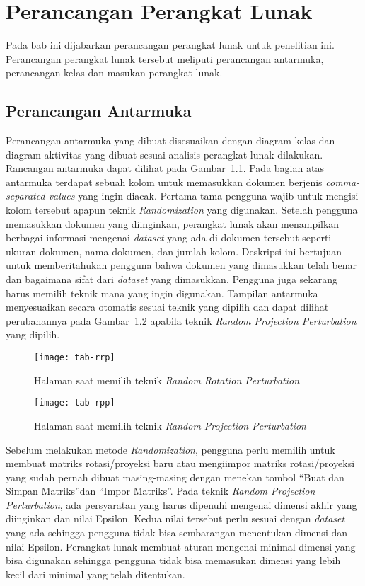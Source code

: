 \chapter{Perancangan Perangkat Lunak}
\label{chap:perancangan}

Pada bab ini dijabarkan perancangan perangkat lunak untuk penelitian ini. Perancangan perangkat lunak tersebut meliputi perancangan antarmuka, perancangan kelas dan masukan perangkat lunak.

\section{Perancangan Antarmuka}
\label{sec:antarmuka}

Perancangan antarmuka yang dibuat disesuaikan dengan diagram kelas dan diagram aktivitas yang dibuat sesuai analisis perangkat lunak dilakukan. Rancangan antarmuka dapat dilihat pada Gambar~\ref{fig:tab-rrp}. Pada bagian atas antarmuka terdapat sebuah kolom untuk memasukkan dokumen berjenis \textit{comma-separated values} yang ingin diacak. Pertama-tama pengguna wajib untuk mengisi kolom tersebut apapun teknik \textit{Randomization} yang digunakan. Setelah pengguna memasukkan dokumen yang diinginkan, perangkat lunak akan menampilkan berbagai informasi mengenai \textit{dataset} yang ada di dokumen tersebut seperti ukuran dokumen, nama dokumen, dan jumlah kolom. Deskripsi ini bertujuan untuk memberitahukan pengguna bahwa dokumen yang dimasukkan telah benar dan bagaimana sifat dari \textit{dataset} yang dimasukkan. Pengguna juga sekarang harus memilih teknik mana yang ingin digunakan. Tampilan antarmuka menyesuaikan secara otomatis sesuai teknik yang dipilih dan dapat dilihat perubahannya pada Gambar~\ref{fig:tab-rpp} apabila teknik \textit{Random Projection Perturbation} yang dipilih. 

\begin{figure}
	\centering
	\texttt{[image: tab-rrp]}
	\caption{Halaman saat memilih teknik \textit{Random Rotation Perturbation}}
	\label{fig:tab-rrp}
\end{figure}

\begin{figure}
	\centering
	\texttt{[image: tab-rpp]}
	\caption{Halaman saat memilih teknik \textit{Random Projection Perturbation}}
	\label{fig:tab-rpp}
\end{figure}

Sebelum melakukan metode \textit{Randomization}, pengguna perlu memilih untuk membuat matriks rotasi/proyeksi baru atau mengiimpor matriks rotasi/proyeksi yang sudah pernah dibuat masing-masing dengan menekan tombol \textquotedblleft Buat dan Simpan Matriks\textquotedblright dan \textquotedblleft Impor Matriks\textquotedblright. Pada teknik \textit{Random Projection Perturbation}, ada persyaratan yang harus dipenuhi mengenai dimensi akhir yang diinginkan dan nilai Epsilon. Kedua nilai tersebut perlu sesuai dengan \textit{dataset} yang ada sehingga pengguna tidak bisa sembarangan menentukan dimensi dan nilai Epsilon. Perangkat lunak membuat aturan mengenai minimal dimensi yang bisa digunakan sehingga pengguna tidak bisa memasukan dimensi yang lebih kecil dari minimal yang telah ditentukan.

